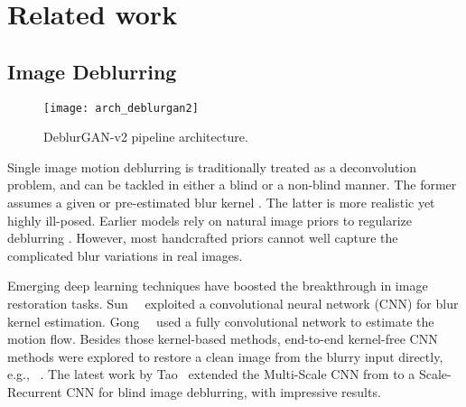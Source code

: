 \documentclass[10pt,twocolumn,letterpaper]{article}
\begin{document}
\section{Related work}
\label{s:related-work}
\subsection{Image Deblurring}
\vspace{-0.5em}


\begin{figure*}[htb]\texttt{[image: arch\_deblurgan2]}
  \vspace{-1.2em}
  \caption{DeblurGAN-v2 pipeline architecture.}
   \vspace{-1em}
  \label{fig:arch}
\end{figure*}

Single image motion deblurring is traditionally treated as a deconvolution problem, and can be tackled in either a blind or a non-blind manner. The former assumes a given or pre-estimated blur kernel \cite{ren2018deep,xu2018motion}. The latter is more realistic yet highly ill-posed. Earlier models rely on natural image priors to regularize deblurring \cite{normalized_sparsity,darkchannelprior,discriminativeprior,hyperlaplace}. However, most handcrafted priors cannot well capture the complicated blur variations in real images. 







Emerging deep learning techniques have boosted the breakthrough in image restoration tasks. Sun~\etal~\cite{SunLearningRemoval} exploited a convolutional neural network (CNN) for blur kernel estimation. Gong~\etal~\cite{GongFromBlur} used a fully convolutional network to estimate the motion flow. Besides those kernel-based methods, end-to-end kernel-free CNN methods were explored to restore a clean image from the blurry input directly, e.g., ~\cite{Nah2016DeepDeblurring, Noroozi2017MotionWild}. The latest work by Tao~\etal\cite{tao2018scale} extended the Multi-Scale CNN from \cite{Nah2016DeepDeblurring} to a Scale-Recurrent CNN for blind image deblurring, with impressive results.
\end{document}
